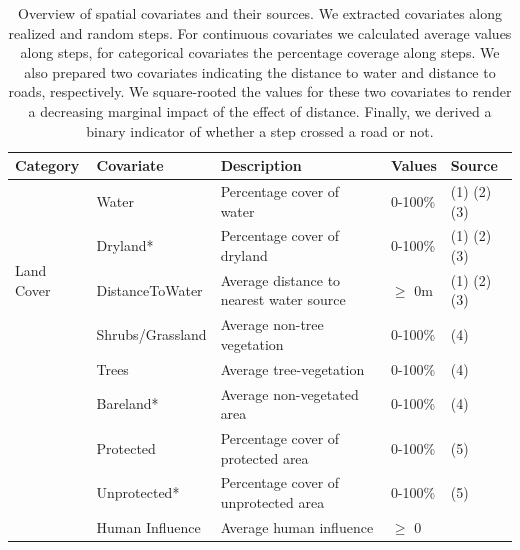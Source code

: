\documentclass[abstract=off,10pt,a4paper,bibliography=totocnumbered]{article}
\begin{document}
\begin{table}[hbtp]
  \begin{center}
    \caption{Overview of spatial covariates and their sources. We extracted
    covariates along realized and random steps. For continuous covariates we
    calculated average values along steps, for categorical covariates the
    percentage coverage along steps. We also prepared two covariates indicating
    the distance to water and distance to roads, respectively. We square-rooted
    the values for these two covariates to render a decreasing marginal impact
    of the effect of distance. Finally, we derived a binary indicator of whether
    a step crossed a road or not.}
    \label{Appendix:Sources}
    \resizebox{\textwidth}{!} {
      \begin{threeparttable}
        \begin{tabular}{lllll}
        \hline
        Category &
          Covariate &
            Description &
              Values &
                Source \\
        \midrule
        \multirow{5}{*}{Land Cover}
          & Water
            & Percentage cover of water
              & 0-100\%
                & (1) (2) (3) \\
          & Dryland*
            & Percentage cover of dryland
              & 0-100\%
                & (1) (2) (3) \\
          & DistanceToWater
            & Average distance to nearest water source
              & \(\geq\) 0m
                & (1) (2) (3) \\
          & Shrubs/Grassland
            & Average non-tree vegetation
              & 0-100\%
                & (4) \\
          & Trees
            & Average tree-vegetation
              & 0-100\%
                & (4) \\
          & Bareland*
            & Average non-vegetated area
              & 0-100\%
                & (4) \\
        \hdashline
        \multirow{2}{*}{Protection Status}
          & Protected
            & Percentage cover of protected area
              & 0-100\%
                & (5) \\
          & Unprotected*
            & Percentage cover of unprotected area
              & 0-100\%
                & (5) \\
        \hdashline
        \multirow{3}{*}{Anthropogenic}
          & Human Influence
            & Average human influence
              & \(\geq\) 0

\end{tabular}
\end{threeparttable}}
\end{center}
\end{table}
\end{document}
